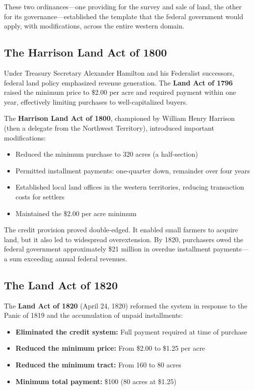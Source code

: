 \documentclass[12pt]{article}
\begin{document}
These two ordinances---one providing for the survey and sale of land, the other for its governance---established the template that the federal government would apply, with modifications, across the entire western domain.

\subsection{The Harrison Land Act of 1800}

Under Treasury Secretary Alexander Hamilton and his Federalist successors, federal land policy emphasized revenue generation.  The \textbf{Land Act of 1796} raised the minimum price to \$2.00 per acre and required payment within one year, effectively limiting purchases to well-capitalized buyers.

The \textbf{Harrison Land Act of 1800}, championed by William Henry Harrison (then a delegate from the Northwest Territory), introduced important modifications:

\begin{itemize}
\item Reduced the minimum purchase to 320 acres (a half-section)
\item Permitted installment payments: one-quarter down, remainder over four years
\item Established local land offices in the western territories, reducing transaction costs for settlers
\item Maintained the \$2.00 per acre minimum
\end{itemize}

The credit provision proved double-edged.  It enabled small farmers to acquire land, but it also led to widespread overextension.  By 1820, purchasers owed the federal government approximately \$21 million in overdue installment payments---a sum exceeding annual federal revenues.

\subsection{The Land Act of 1820}

The \textbf{Land Act of 1820} (April 24, 1820) reformed the system in response to the Panic of 1819 and the accumulation of unpaid installments:

\begin{itemize}
\item \textbf{Eliminated the credit system:} Full payment required at time of purchase
\item \textbf{Reduced the minimum price:} From \$2.00 to \$1.25 per acre
\item \textbf{Reduced the minimum tract:} From 160 to 80 acres
\item \textbf{Minimum total payment:} \$100 (80 acres at \$1.25)
\end{itemize}
\end{document}
